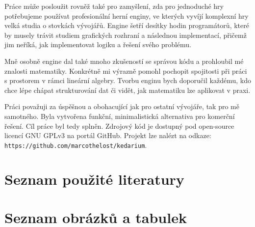 \documentclass[12pt]{article}
\makeatletter
\renewcommand\listoffigures{%
        \@starttoc{lof}%
}
\makeatother
\begin{document}
Práce může posloužit rovněž také pro zamyšlení, zda pro jednoduché hry potřebujeme používat profesionální herní enginy, ve kterých vyvíjí komplexní hry velká studia o stovkách vývojářů. Engine šetří desítky hodin programátorů, které by musely trávit studiem grafických rozhraní a následnou implementací, přičemž jim neříká, jak implementovat logiku a řešení svého problému.

Mně osobně engine dal také mnoho zkušeností se správou kódu a prohloubil mé znalosti matematiky. Konkrétně mi výrazně pomohl pochopit spojitosti při práci s prostorem v rámci lineární algebry. Tvorbu enginu bych doporučil každému, kdo chce lépe chápat strukturování dat či vidět, jak matematiku lze aplikovat v praxi.

Práci považuji za úspěšnou a obohacující jak pro ostatní vývojáře, tak pro mě samotného. Byla vytvořena funkční, minimalistická alternativa pro komerční řešení. Cíl práce byl tedy splněn. Zdrojový kód je dostupný pod open-source licencí GNU GPLv3 na portál GitHub. Projekt lze nalézt na odkaze: \\\texttt{https://github.com/marcothelost/kedarium}.

\pagebreak

\section{Seznam použité literatury}

\printbibliography[heading=none]

\pagebreak

\section{Seznam obrázků a tabulek}

\listoffigures
\end{document}
